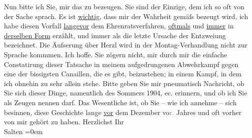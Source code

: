 \begin{ledgroupsized}[t]{13cm}
           \pstart
           Nun bitte ich Sie, mir das zu bezeugen. Sie sind der Einzige, dem ich so oft von der
               Sache sprach. Es ist \uline{wichtig}, dass mir der Wahrheit
               gemäſs bezeugt wird, ich habe diesen Vorfall \uline{lange}\uline{vor} dem Ehrenratsverfahren, \uline{oftmals} und \uline{immer} in \uline{der}{\pb}\uline{selben Form} erzählt, und immer als die letzte Ursache
               der Entzweiung bezeichnet. \pend
           \pstart
           Die Äuſserung über Herzl wird in der
               Montag-Verhandlung nicht zur Sprache kommmen. Ich hoffe. Sie zögern nicht, mir durch
                  \introOben{}mir\introOben{} die einfache Constatirung dieser Tatsache in meinem
               aufgedrungenen Abwehrkampf gegen eine der bissigsten Canaillen, die es gibt,
               beizustehen; in einem Kampf, in dem ich ohnehin zu sehr allein stehe. Bitte geben Sie
               mir pneumatisch Nachricht, ob Sie sich dieser Dinge, namentlich des Sommers
                  1904, ec. erinnern, und ob ich Sie als Zeugen nennen darf. Das Wesentliche
               ist, ob Sie – wie ich annehme – sich besinnen, diese Geschichte lange \uline{vor} dem Dezember vo\textcolor{gray}{r.} Jahres und
               oft vorher von mir gehört zu haben. \pend
           \pstart
           Herzlichst Ihr {\\[\baselineskip]}\spacefill\mbox{Salten}\pend
           \leftskip=0em{}
         
         \endnumbering{}\end{ledgroupsized}\begin{anhang}\end{anhang}\newcommand{\dateiname}{L03434}\newcommand{\titel}{Felix Salten an Arthur Schnitzler, [18.? 10. 1906]}\newcommand{\editorInnen}{Martin Anton Müller und Laura Untner}
      